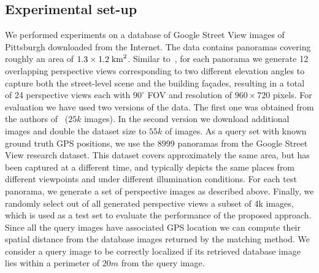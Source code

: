 \documentclass[table]{article} %
\begin{document}
   	\subsection{Experimental set-up}
		We performed experiments on a database of Google Street View images of Pittsburgh downloaded from the Internet. The data contains panoramas covering roughly an area of $1.3 \times 1.2 \; {\rm km}^2$. 		
		Similar to~\cite{Chen11}, for each panorama we generate 12 overlapping perspective views corresponding to two different elevation angles to capture both the street-level scene and the building fa\c{c}ades, resulting in a total of 24 perspective views each with $90^\circ$ FOV and resolution of $960 \times 720$ pixels.
		For evaluation we have used two versions of the data. The first one was obtained from the authors of~\cite{Gronat2013} ($25k$ images). In the second version we download additional images and double the dataset size to $55k$ of images. 
		As a query set with known ground truth GPS positions, we use the 8999 panoramas from the Google Street View research dataset. This dataset covers approximately the same area, but has been captured at a different time, and typically depicts the same places from different viewpoints and under different illumination conditions. For each test panorama, we generate a set of perspective images as described above. Finally, we randomly select out of all generated perspective views a subset of 4k images, which is used as a test set to evaluate the performance of the proposed approach.
			Since all the query images have associated GPS location we can compute their spatial distance from the database images returned by the matching method. We consider a query image to be correctly localized if its retrieved database image lies within a perimeter of $20m$ from the query image.
\end{document}
